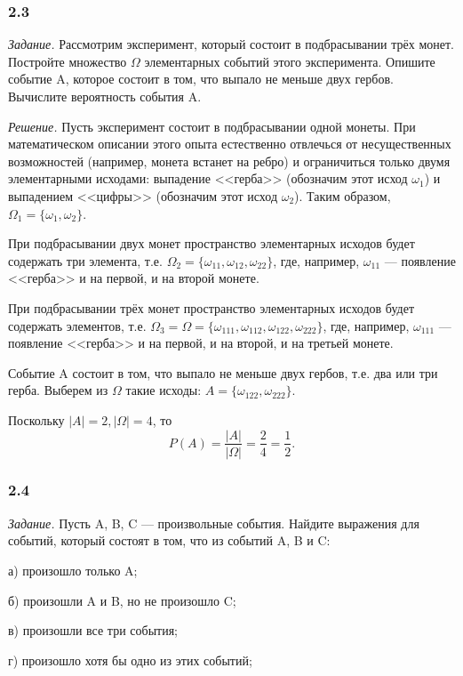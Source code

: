\documentclass{book}
\begin{document}
\subsubsection*{2.3}

\textit{Задание.} Рассмотрим эксперимент, который состоит в подбрасывании трёх монет. Постройте множество $\Omega$ элементарных событий этого эксперимента. Опишите событие A, которое состоит в том, что выпало не меньше двух гербов. Вычислите вероятность события A.

\textit{Решение.} Пусть эксперимент состоит в подбрасывании одной монеты. При математическом описании этого опыта естественно отвлечься от несущественных возможностей (например, монета встанет на ребро) и ограничиться только двумя элементарными исходами: выпадение <<герба>> (обозначим этот исход $\omega_1$) и выпадением <<цифры>> (обозначим этот исход $\omega_2$). Таким образом, $\Omega_1=\{\omega_1, \omega_2\}$.

При подбрасывании двух монет пространство элементарных исходов будет содержать три элемента, т.е. $\Omega_2=\{\omega_{11}, \omega_{12}, \omega_{22}\}$, где, например, $\omega_{11}$ --- появление <<герба>> и на первой, и на второй монете.

При подбрасывании трёх монет пространство элементарных исходов будет содержать элементов, т.е. $\Omega_3=\Omega=\{\omega_{111}, \omega_{112}, \omega_{122}, \omega_{222}\}$, где, например, $\omega_{111}$ --- появление <<герба>> и на первой, и на второй, и на третьей монете.

Событие A состоит в том, что выпало не меньше двух гербов, т.е. два или три герба. Выберем из $\Omega$ такие исходы: $A=\{\omega_{122}, \omega_{222}\}$.

Поскольку $|A|=2, |\Omega|=4$, то $$P(A)=\frac{|A|}{|\Omega|}=\frac{2}{4}=\frac{1}{2}.$$

\subsubsection*{2.4}

\textit{Задание.} Пусть A, B, C --- произвольные события. Найдите выражения для событий, который состоят в том, что из событий A, B и C:

а) произошло только  A;

б) произошли A и B, но не произошло C;

в) произошли все три события;

г) произошло хотя бы одно из этих событий;
\end{document}
